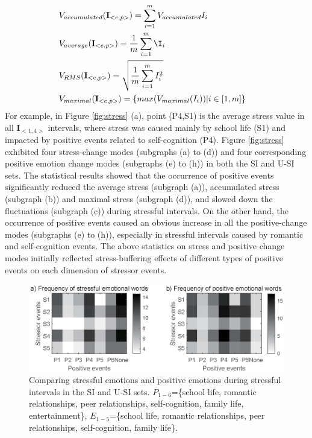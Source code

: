 \begin{equation}
\begin{aligned}
& V_{accumulated}(\textbf{I}_{<e,p>})=\sum_{i=1}^m{V_{accumulated}I_i}&\\
& V_{average}(\textbf{I}_{<e,p>})=\frac{1}{m}\sum_{i=1}^m\I_i&\\
& V_{RMS}(\textbf{I}_{<e,p>})=\sqrt{\frac{1}{m}\sum_{i=1}^mI_i^2}&\\
& V_{maximal}(\textbf{I}_{<e,p>}) = \{max(V_{maximal}(I_i))|i\in[1,m]\} &
 \end{aligned}
 \end{equation}
For example, in Figure \ref{fig:stress} (a), 
point (P4,S1) is the average stress value in all $\textbf{I}_{<1,4>}$ intervals, 
where stress was caused mainly by school life (S1) and impacted by positive events related to self-cognition (P4).
Figure \ref{fig:stress} exhibited four stress-change modes (subgraphs (a) to (d))
and four corresponding positive emotion change modes (subgraphs (e) to (h)) in both the SI and U-SI sets.
The statistical results showed that the occurrence of positive events significantly
reduced the average stress (subgraph (a)), accumulated stress (subgraph (b)) and maximal stress (subgraph (d)),
and slowed down the fluctuations (subgraph (c)) during stressful intervals.
On the other hand,
the occurrence of positive events caused an obvious increase in all the positive-change modes 
(subgraphs (e) to (h)), especially in stressful intervals caused by romantic and self-cognition events. 
The above statistics on stress and positive change modes
initially reflected stress-buffering effects of different types of positive events on each dimension of stressor events.

\begin{figure}[h]
\centering
\includegraphics[width=\linewidth]{figs/gray/emotion.eps}
\caption{\small{Comparing stressful emotions and positive emotions during stressful intervals in the SI and U-SI sets.
$P_{1-6}$=\{school life, romantic relationships, peer relationships, self-cognition, family life, entertainment\},
$E_{1-5}$=\{school life, romantic relationships, peer relationships, self-cognition, family life\}.
}}
\label{fig:topicAll}
\end{figure}

